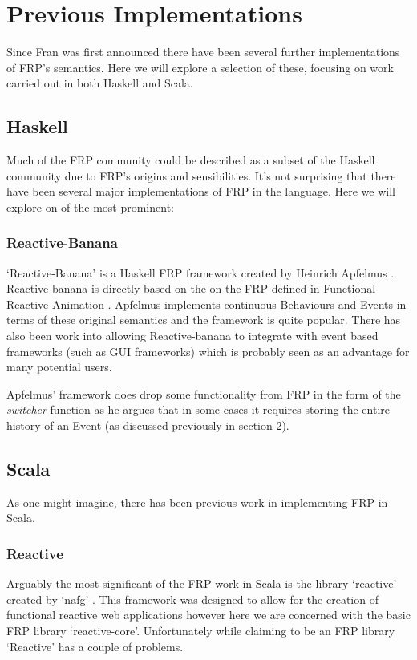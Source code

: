 \chapter{Previous Implementations}
  Since Fran was first announced there have been several further implementations of FRP's semantics. Here
  we will explore a selection of these, focusing on work carried out in both Haskell and Scala.
  
  \section{Haskell}
    Much of the FRP community could be described as a subset of the Haskell community due to FRP's
    origins and sensibilities. It's not surprising that there have been several major implementations
    of FRP in the language. Here we will explore on of the most prominent:
    
    \subsection{Reactive-Banana}
      `Reactive-Banana' is a Haskell FRP framework created by Heinrich Apfelmus \cite{Apfelmus}. Reactive-banana
      is directly based on the on the FRP defined in Functional Reactive Animation \cite{Elliott1997}. Apfelmus
      implements continuous Behaviours and Events in terms of these original semantics and the framework
      is quite popular. There has also been work into allowing Reactive-banana to integrate with event based
      frameworks (such as GUI frameworks) which is probably seen as an advantage for many potential users.
      
      Apfelmus' framework does drop some functionality from FRP in the form of the \emph{switcher} function as
      he argues that in some cases it requires storing the entire history of an Event (as discussed previously
      in section 2).

  \section{Scala}
    As one might imagine, there has been previous work in implementing FRP in Scala. 

    \subsection{Reactive}
      Arguably the most significant of the FRP work in Scala is the library `reactive' created by `nafg' \cite{Nafg}. This    
      framework was designed to allow for the creation of functional reactive web applications however here we are concerned 
      with the basic FRP library `reactive-core'. Unfortunately while claiming to be an FRP library `Reactive'
      has a couple of problems.

